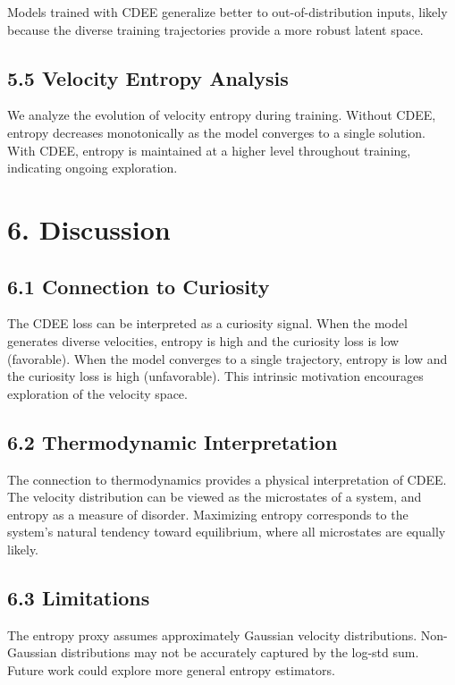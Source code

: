 \documentclass[12pt]{article}
\begin{document}
Models trained with CDEE generalize better to out-of-distribution inputs, likely because the diverse training trajectories provide a more robust latent space.

\subsection{5.5 Velocity Entropy Analysis}

We analyze the evolution of velocity entropy during training. Without CDEE, entropy decreases monotonically as the model converges to a single solution. With CDEE, entropy is maintained at a higher level throughout training, indicating ongoing exploration.

\section{6. Discussion}

\subsection{6.1 Connection to Curiosity}

The CDEE loss can be interpreted as a curiosity signal. When the model generates diverse velocities, entropy is high and the curiosity loss is low (favorable). When the model converges to a single trajectory, entropy is low and the curiosity loss is high (unfavorable). This intrinsic motivation encourages exploration of the velocity space.

\subsection{6.2 Thermodynamic Interpretation}

The connection to thermodynamics provides a physical interpretation of CDEE. The velocity distribution can be viewed as the microstates of a system, and entropy as a measure of disorder. Maximizing entropy corresponds to the system's natural tendency toward equilibrium, where all microstates are equally likely.

\subsection{6.3 Limitations}

The entropy proxy assumes approximately Gaussian velocity distributions. Non-Gaussian distributions may not be accurately captured by the log-std sum. Future work could explore more general entropy estimators.
\end{document}

